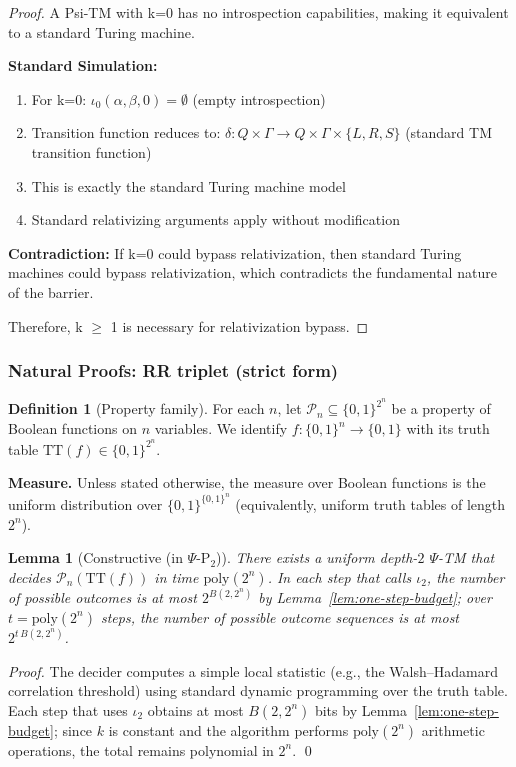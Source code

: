 \documentclass[11pt]{article}
\newtheorem{lemma}[theorem]{Lemma}
\theoremstyle{definition}
\newtheorem{definition}[theorem]{Definition}
\newcommand{\PSi}{\Psi}
\newcommand{\bits}{\{0,1\}}
\begin{document}
\begin{proof}
A Psi-TM with k=0 has no introspection capabilities, making it equivalent to a standard Turing machine.

\textbf{Standard Simulation:}
\begin{enumerate}
\item For k=0: $\iota_0(\alpha, \beta, 0) = \emptyset$ (empty introspection)
\item Transition function reduces to: $\delta: Q \times \Gamma \to Q \times \Gamma \times \{L, R, S\}$ (standard TM transition function)
\item This is exactly the standard Turing machine model
\item Standard relativizing arguments apply without modification
\end{enumerate}

\textbf{Contradiction:} If k=0 could bypass relativization, then standard Turing machines could bypass relativization, which contradicts the fundamental nature of the barrier.

Therefore, k $\geq$ 1 is necessary for relativization bypass.
\end{proof}

\subsubsection{Natural Proofs: RR triplet (strict form)}
\label{sec:natural-rr}

\begin{definition}[Property family]
For each $n$, let $\mathcal{P}_n\subseteq \{0,1\}^{2^n}$ be a property of Boolean functions on $n$ variables. We identify $f:\bits^n\to\bits$ with its truth table $\mathrm{TT}(f)\in\bits^{2^n}$.
\end{definition}

\noindent\textbf{Measure.} Unless stated otherwise, the measure over Boolean functions is the uniform distribution over $\{0,1\}^{\{0,1\}^n}$ (equivalently, uniform truth tables of length $2^n$).

\begin{lemma}[Constructive (in $\Psi$-P$_2$)]
There exists a uniform depth-$2$ $\PSi$-TM that decides $\mathcal{P}_n(\mathrm{TT}(f))$ in time $\mathrm{poly}(2^n)$. In each step that calls $\iota_2$, the number of possible outcomes is at most $2^{B(2,2^n)}$ by Lemma~\ref{lem:one-step-budget}; over $t=\mathrm{poly}(2^n)$ steps, the number of possible outcome sequences is at most $2^{t\,B(2,2^n)}$.
\end{lemma}
\begin{proof}
The decider computes a simple local statistic (e.g., the Walsh--Hadamard correlation threshold) using standard dynamic programming over the truth table. Each step that uses $\iota_2$ obtains at most $B(2,2^n)$ bits by Lemma~\ref{lem:one-step-budget}; since $k$ is constant and the algorithm performs $\mathrm{poly}(2^n)$ arithmetic operations, the total remains polynomial in $2^n$. \qed
\end{proof}
\end{document}
